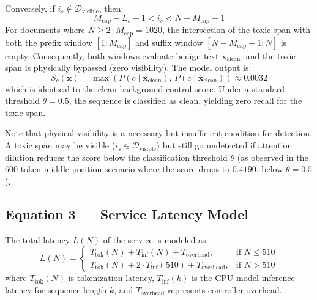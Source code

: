 \documentclass[10pt]{article}
\begin{document}
Conversely, if $i_s \notin \mathcal{D}_{\text{visible}}$, then:
\begin{equation}
M_{\text{cap}} - L_s + 1 < i_s < N - M_{\text{cap}} + 1
\end{equation}
For documents where $N \ge 2 \cdot M_{\text{cap}} = 1020$, the intersection of the toxic span with both the prefix window $[1:M_{\text{cap}}]$ and suffix window $[N - M_{\text{cap}} + 1:N]$ is empty. Consequently, both windows evaluate benign text $\mathbf{x}_{\text{clean}}$, and the toxic span is physically bypassed (zero visibility). The model output is:
\begin{equation}
S_c(\mathbf{x}) = \max\left( P(c \mid \mathbf{x}_{\text{clean}}), \, P(c \mid \mathbf{x}_{\text{clean}}) \right) \approx 0.0032
\end{equation}
which is identical to the clean background control score. Under a standard threshold $\theta = 0.5$, the sequence is classified as clean, yielding zero recall for the toxic span.

Note that physical visibility is a necessary but insufficient condition for detection. A toxic span may be visible ($i_s \in \mathcal{D}_{\text{visible}}$) but still go undetected if attention dilution reduces the score below the classification threshold $\theta$ (as observed in the $600$-token middle-position scenario where the score drops to $0.4190$, below $\theta = 0.5$).

\subsection{Equation 3 --- Service Latency Model}
The total latency $L(N)$ of the service is modeled as:
\begin{equation}
L(N) = \begin{cases} T_{\text{tok}}(N) + T_{\text{inf}}(N) + T_{\text{overhead}}, & \text{if } N \le 510 \\ T_{\text{tok}}(N) + 2 \cdot T_{\text{inf}}(510) + T_{\text{overhead}}, & \text{if } N > 510 \end{cases}
\end{equation}
where $T_{\text{tok}}(N)$ is tokenization latency, $T_{\text{inf}}(k)$ is the CPU model inference latency for sequence length $k$, and $T_{\text{overhead}}$ represents controller overhead.
\end{document}
